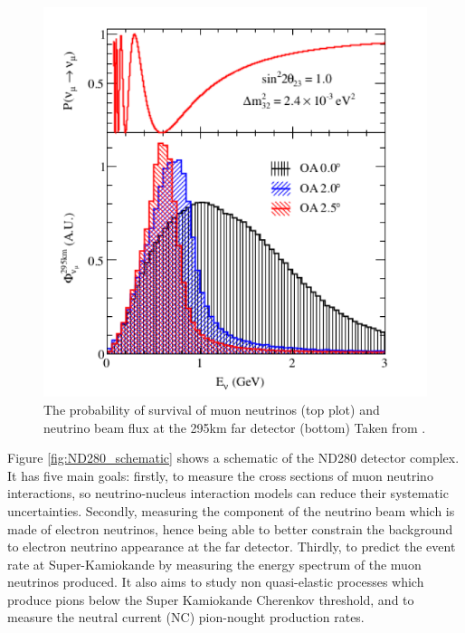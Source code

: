 \begin{figure}
    \includegraphics[width=\textwidth]{Figures/nuprobosc.png}
    \caption{The probability of survival of muon neutrinos (top plot) and neutrino beam flux at the 295km far detector (bottom) Taken from \cite{t2k_collaboration_t2k_2013}.}
    \label{fig:nuprobosc}
\end{figure}

Figure \ref{fig:ND280_schematic} shows a schematic of the ND280 detector complex. It has five main goals: firstly, to measure the cross sections of muon neutrino interactions, so neutrino-nucleus interaction models can reduce their systematic uncertainties. Secondly, measuring the component of the neutrino beam which is made of electron neutrinos, hence being able to better constrain the background to electron neutrino appearance at the far detector. Thirdly, to predict the event rate at Super-Kamiokande by measuring the energy spectrum of the muon neutrinos produced. It also aims to study non quasi-elastic processes which produce pions below the Super Kamiokande Cherenkov threshold, and to measure the neutral current (NC) pion-nought production rates. 

